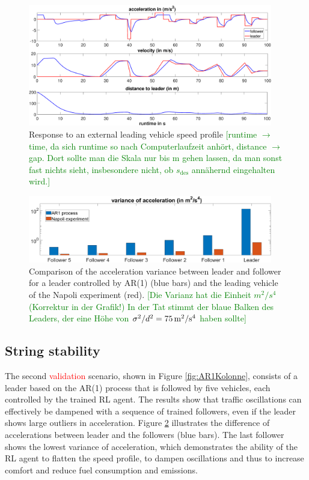 \documentclass[review]{elsarticle}
\providecommand{\red}[1]{\textcolor{red}{#1}}
\providecommand{\green}[1]{\textcolor{green}{#1}}
\providecommand{\martin}[1]{\red{#1}} %
\providecommand{\martinc}[1]{\green{[#1]}} %
\providecommand{\sub}[1]{_{\mathrm{#1}}}  %
\providecommand{\3}{{\ss}}
\begin{document}
\begin{figure}
	\centering
	\includegraphics[width=0.95\textwidth]{images/manipulatedLeader.eps}
	\caption{Response to an external leading vehicle speed profile
\martinc{runtime $\to$ time, da sich runtime so nach Computerlaufzeit
  anh\"ort, distance $\to$ gap. Dort sollte man die Skala nur bis
  \unit[50]{m} gehen lassen, da man sonst fast nichts sieht,
  insbesondere nicht, ob $s\sub{des}$ ann\"ahernd eingehalten wird.} }
	\label{fig:manipulatedLeader}
\end{figure}

\begin{figure}
	\centering
	\includegraphics[width=0.95\textwidth]{images/VarAccComp}
	\caption{Comparison of the acceleration variance between
          leader and follower for a leader controlled by AR(1) (blue
          bars) and the leading vehicle of the Napoli experiment
          (red).
\martinc{Die Varianz hat die Einheit $\unit{m^2/s^4}$ (Korrektur in der
Grafik!) In der Tat stimmt der blaue Balken des Leaders, der eine
H\"ohe von $\sigma^2/d^2=\unit[75]{m^2/s^4}$ haben sollte}}
	\label{fig:VarAccComp}
\end{figure}






\subsection{String stability}
\label{sec:stringStability}
The second \martin{validation} scenario, shown in Figure
\ref{fig:AR1Kolonne}, consists of a leader based on the AR(1) process
that is
followed by five vehicles, each controlled by the trained RL
agent. The results show that traffic oscillations can effectively be
dampened with a sequence of trained followers, even if the leader
shows large outliers in acceleration. Figure \ref{fig:VarAccComp}
illustrates the difference of accelerations between leader and the
followers (blue bars). The last follower shows the lowest variance of
acceleration, which demonstrates the ability of the RL agent to
flatten the speed profile, to dampen oscillations and thus to increase
comfort and reduce fuel consumption and emissions.   
\end{document}
